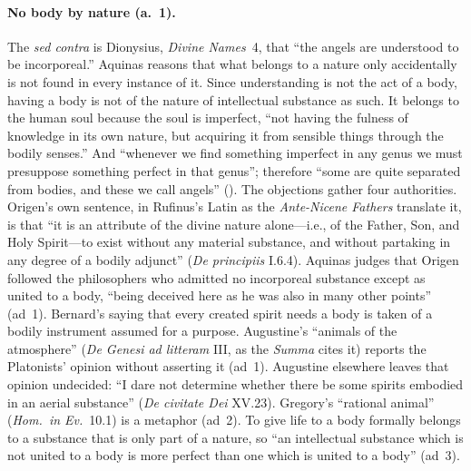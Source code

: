 \paragraph{No body by nature (a.~1).} The \emph{sed contra} is Dionysius,
\emph{Divine Names}~4, that ``the angels are understood to be
incorporeal.'' Aquinas reasons that what belongs to a nature only
accidentally is not found in every instance of it. Since understanding is
not the act of a body, having a body is not of the nature of intellectual
substance as such. It belongs to the human soul because the soul is
imperfect, ``not having the fulness of knowledge in its own nature, but
acquiring it from sensible things through the bodily senses.'' And
``whenever we find something imperfect in any genus we must presuppose
something perfect in that genus''; therefore ``some are quite separated
from bodies, and these we call angels'' (). The objections gather four
authorities. Origen's own sentence, in Rufinus's Latin as the
\emph{Ante-Nicene Fathers} translate it, is that ``it is an attribute
of the divine nature alone---i.e., of the Father, Son, and Holy
Spirit---to exist without any material substance, and without partaking in
any degree of a bodily adjunct'' (\emph{De principiis} I.6.4). Aquinas
judges that Origen followed the philosophers who admitted no incorporeal
substance except as united to a body, ``being deceived here as he was also
in many other points'' (ad~1). Bernard's saying that every created spirit
needs a body is taken of a bodily instrument assumed for a purpose.
Augustine's ``animals of the atmosphere'' (\emph{De Genesi ad litteram}
III, as the \emph{Summa} cites it) reports the Platonists' opinion without
asserting it (ad~1). Augustine elsewhere leaves that opinion undecided:
``I dare not determine whether there be some spirits embodied in an aerial
substance'' (\emph{De civitate Dei} XV.23). Gregory's ``rational animal''
(\emph{Hom.\ in Ev.}\ 10.1) is a metaphor (ad~2). To give life to a body
formally belongs to a substance that is only part of a nature, so ``an
intellectual substance which is not united to a body is more perfect than
one which is united to a body'' (ad~3).

